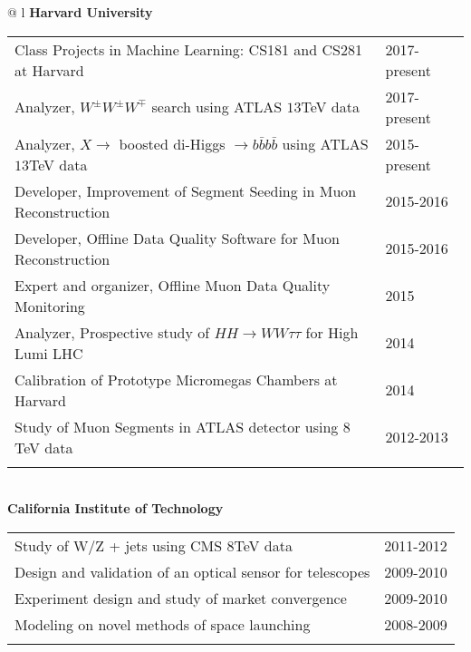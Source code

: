 \documentclass[letterpaper,11pt,oneside]{article}
\begin{document}
\begin{flushleft}
 \begin{tabular}{@{} l}
    \textbf{Harvard University} \\ 
    \begin{tabular}{@{} l l }
 Class Projects in Machine Learning: CS181 and CS281 at Harvard & 2017-present\\
 Analyzer, $W^{\pm} W^{\pm} W^{\mp}$ search using ATLAS $13$TeV data & 2017-present\\
 Analyzer, $X \to$ boosted  di-Higgs $\to b\bar{b}b\bar{b}$ using ATLAS $13$TeV data & 2015-present\\
 Developer, Improvement of Segment Seeding in Muon Reconstruction & 2015-2016\\
 Developer, Offline Data Quality Software for Muon Reconstruction & 2015-2016\\
 Expert and organizer,  Offline Muon Data Quality Monitoring & 2015\\
 Analyzer, Prospective study of $HH \to WW\tau\tau$ for High Lumi LHC & 2014\\
 Calibration of Prototype Micromegas Chambers at Harvard & 2014\\
 Study of Muon Segments in ATLAS detector using $8$TeV data & 2012-2013\\
    \hspace{0.8\linewidth} & \hspace{0.1\linewidth} \\
     \end{tabular}
     \\
     \textbf{California Institute of Technology} \\
     \begin{tabular}{@{} l l }
 Study of W/Z + jets using CMS $8$TeV data&2011-2012\\
 Design and validation of an optical sensor for telescopes&2009-2010\\
 Experiment design and study of market convergence &2009-2010\\
 Modeling on novel methods of space launching&2008-2009\\
    \hspace{0.8\linewidth} & \hspace{0.1\linewidth} \\
      \end{tabular}
      \end{tabular}
\end{flushleft}
\end{document}
